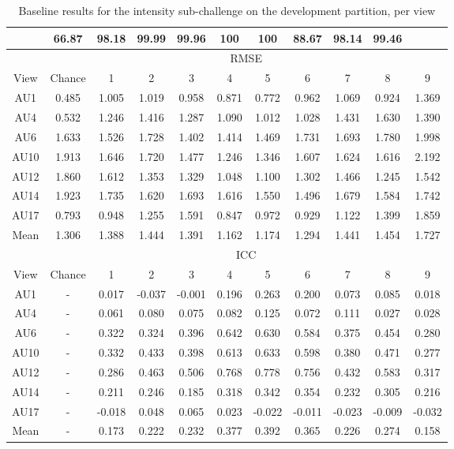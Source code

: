 \documentclass[a4paper, 10pt, conference]{ieeeconf}      \usepackage{FG2017}
\begin{document}
\begin{table*}[t]
\begin{center}
\caption{Baseline results for the intensity sub-challenge on the development partition, per view}
\vspace{2mm}
\label{t:baseline_intensity_per_view}
\begin{tabular}{c|c|c|c|c|c|c|c|c|c|c|}
\hhline{-----------} 
 \multicolumn{2}{c|}{\% Detected frames} & 66.87 &  98.18 & 99.99 & 99.96 & 100 & 100 & 88.67 & 98.14 & 99.46 \\
\hline
& \multicolumn{10}{c|}{RMSE} \\
\hline
View & Chance & 1 & 2 & 3 & 4 & 5 & 6 & 7 & 8 & 9 \\
\hline
AU1 & 0.485 & 1.005 & 1.019 & 0.958 & 0.871 & 0.772 & 0.962 & 1.069 & 0.924 & 1.369 \\
AU4 & 0.532 & 1.246 & 1.416 & 1.287 & 1.090 & 1.012 & 1.028 & 1.431 & 1.630 & 1.390 \\
AU6 & 1.633 & 1.526 & 1.728 & 1.402 & 1.414 & 1.469 & 1.731 & 1.693 & 1.780 & 1.998 \\
AU10 & 1.913 & 1.646 & 1.720 & 1.477 & 1.246 & 1.346 & 1.607 & 1.624 & 1.616 & 2.192 \\
AU12 & 1.860 & 1.612 & 1.353 & 1.329 & 1.048 & 1.100 & 1.302 & 1.466 & 1.245 & 1.542 \\
AU14 & 1.923 & 1.735 & 1.620 & 1.693 & 1.616 & 1.550 & 1.496 & 1.679 & 1.584 & 1.742 \\
AU17 & 0.793 & 0.948 & 1.255 & 1.591 & 0.847 & 0.972 & 0.929 & 1.122 & 1.399 & 1.859 \\
\hline
Mean & 1.306 &1.388 & 1.444 & 1.391 & 1.162 & 1.174 & 1.294 & 1.441 & 1.454 & 1.727 \\ \hline
& \multicolumn{10}{c|}{ICC} \\
\hline
View & Chance & 1 & 2 & 3 & 4 & 5 & 6 & 7 & 8 & 9 \\
\hline
AU1& - & 0.017 & -0.037 & -0.001 & 0.196 & 0.263 & 0.200 & 0.073 & 0.085 & 0.018 \\ AU4 & - & 0.061 & 0.080 & 0.075 & 0.082 & 0.125 & 0.072 & 0.111 & 0.027 & 0.028 \\ AU6 & - & 0.322 & 0.324 & 0.396 & 0.642 & 0.630 & 0.584 & 0.375 & 0.454 & 0.280 \\ AU10 & - & 0.332 & 0.433 & 0.398 & 0.613 & 0.633 & 0.598 & 0.380 & 0.471 & 0.277 \\ AU12 & - & 0.286 & 0.463 & 0.506 & 0.768 & 0.778 & 0.756 & 0.432 & 0.583 & 0.317 \\ AU14 & - & 0.211 & 0.246 & 0.185 & 0.318 & 0.342 & 0.354 & 0.232 & 0.305 & 0.216 \\ AU17 & - & -0.018 & 0.048 & 0.065 & 0.023 & -0.022 & -0.011 & -0.023 & -0.009 & -0.032 \\ 
\hline
Mean & - & 0.173 & 0.222 & 0.232 & 0.377 & 0.392 & 0.365 & 0.226 &0.274 & 0.158
 \\
\hline
\end{tabular}
\end{center}
\end{table*}
\end{document}
